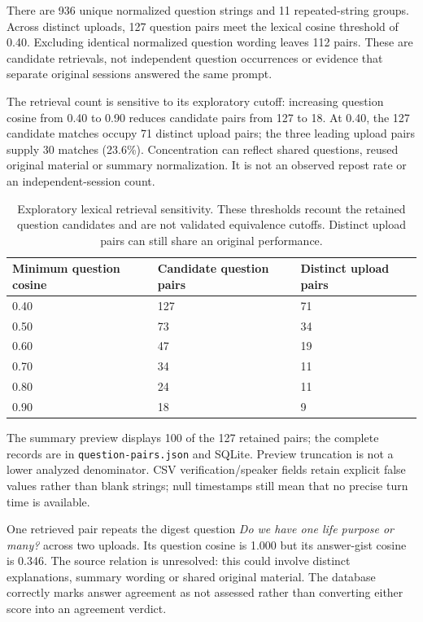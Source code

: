 There are 936 unique normalized question strings and 11 repeated-string groups. Across distinct uploads, 127 question pairs meet the lexical cosine threshold of 0.40. Excluding identical normalized question wording leaves 112 pairs. These are candidate retrievals, not independent question occurrences or evidence that separate original sessions answered the same prompt.

The retrieval count is sensitive to its exploratory cutoff: increasing question cosine from 0.40 to 0.90 reduces candidate pairs from 127 to 18. At 0.40, the 127 candidate matches occupy 71 distinct upload pairs; the three leading upload pairs supply 30 matches (23.6\%). Concentration can reflect shared questions, reused original material or summary normalization. It is not an observed repost rate or an independent-session count.

\begin{table}[htbp]
\small\centering
\setlength{\tabcolsep}{4pt}
\begin{tabular}{p{}p{}p{}}
\toprule
Minimum question cosine & Candidate question pairs & Distinct upload pairs \\ \midrule
0.40 & 127 & 71 \\
0.50 & 73 & 34 \\
0.60 & 47 & 19 \\
0.70 & 34 & 11 \\
0.80 & 24 & 11 \\
0.90 & 18 & 9 \\
\bottomrule
\end{tabular}
\caption{Exploratory lexical retrieval sensitivity. These thresholds recount the retained question candidates and are not validated equivalence cutoffs. Distinct upload pairs can still share an original performance.}
\end{table}


The summary preview displays 100 of the 127 retained pairs; the complete records are in \texttt{question-pairs.json} and SQLite. Preview truncation is not a lower analyzed denominator. CSV verification/speaker fields retain explicit false values rather than blank strings; null timestamps still mean that no precise turn time is available.

One retrieved pair repeats the digest question \emph{Do we have one life purpose or many?} across two uploads. Its question cosine is 1.000 but its answer-gist cosine is 0.346. The source relation is unresolved: this could involve distinct explanations, summary wording or shared original material. The database correctly marks answer agreement as not assessed rather than converting either score into an agreement verdict.

